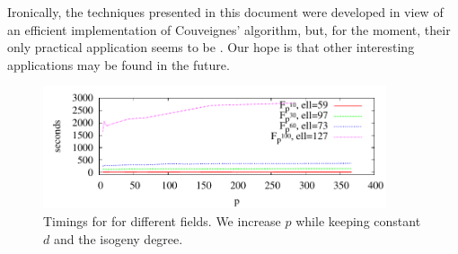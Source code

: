   Ironically, the
techniques presented in this document were developed in view of an
efficient implementation of Couveignes' algorithm, but, for the
moment, their only practical application seems to be \ctwoud{}. Our hope
is that other interesting applications may be found in the future.

\begin{figure}
  \centering
  \includegraphics[width=0.9\textwidth]{isogeny/LSp}
  \caption{Timings for  for different fields. We
    increase $p$ while keeping constant $d$ and the isogeny degree.}
  \label{fig:LSp}
\end{figure}


%
